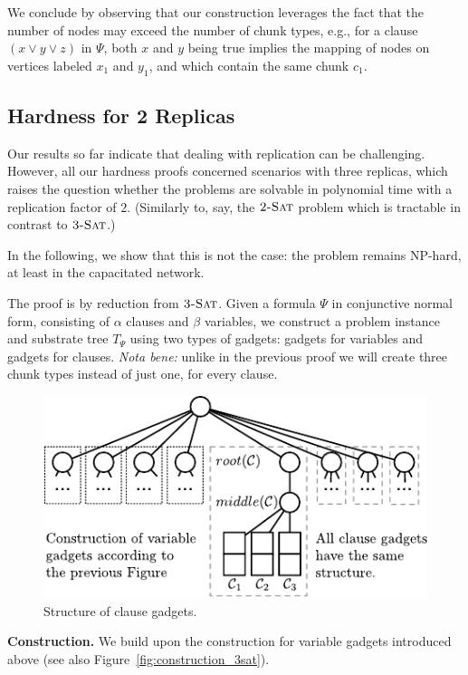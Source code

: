 \documentclass[preprint,12pt]{elsarticle}
\newcommand{\carlo}[1]{\textcolor{red}{carlo: #1}}
\newcommand{\clauses}{\alpha}
\newcommand{\vars}{\beta}
\newcommand{\TSAT}{\textsc{3-Sat}}
\newcommand{\ZSAT}{\textsc{2-Sat}}
\newcommand{\Formula}{\ensuremath{\Psi}}
\begin{document}
We conclude by observing that our construction leverages the fact that
the number of nodes may exceed the number of chunk types, e.g.,
for a clause $(x \vee y \vee z)$ in
$\Formula$, both $x$ and $y$ being true implies the
mapping of nodes on vertices labeled $x_1$ and $y_1$, and which contain the
same chunk $c_1$.


\subsection{Hardness for 2 Replicas}\label{ssec:two}

Our results so far indicate that dealing with replication can be challenging.
However, all our hardness proofs concerned scenarios with three replicas,
which raises the question whether the problems are solvable in polynomial
time with a replication factor of $2$. (Similarly to, say, the $\ZSAT$ problem
which is tractable in contrast to $\TSAT$.)

In the following, we show that this is not the case: the problem remains
NP-hard, at least in the capacitated network.

The proof is by reduction from $\TSAT$. Given a formula $\Formula$ in
conjunctive normal form, consisting of $\clauses$ clauses and $\vars$ variables, we construct a problem instance and substrate tree
$T_{\Formula}$ using two types of gadgets: gadgets for variables and
gadgets for clauses. \emph{Nota bene:}
unlike in the previous proof we will create three chunk types
instead of just one, for every clause.

\begin{figure}[htbp]
\centering
\includegraphics[width=0.99\columnwidth]{figs/construction_2replica}
\caption{Structure of clause gadgets.}
\label{fig:clause-gadget}
\end{figure}


\textbf{Construction.}
We build upon the construction for variable gadgets introduced above (see also Figure~\ref{fig:construction_3sat}).
\end{document}
